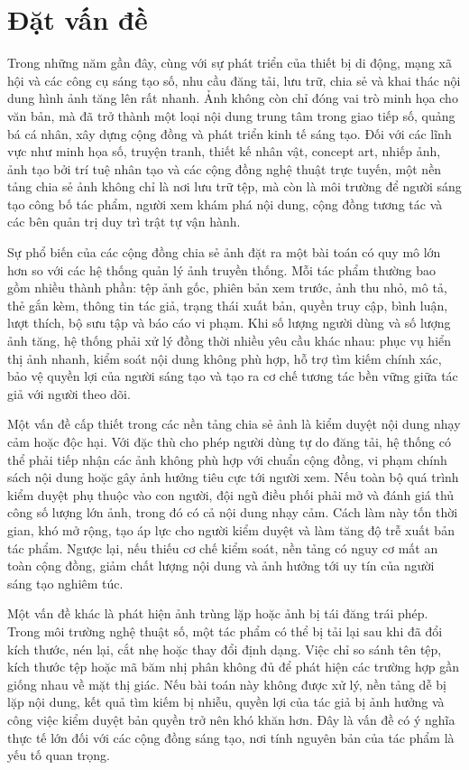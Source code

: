 \section{Đặt vấn đề}

Trong những năm gần đây, cùng với sự phát triển của thiết bị di động, mạng xã hội và các công cụ sáng tạo số, nhu cầu đăng tải, lưu trữ, chia sẻ và khai thác nội dung hình ảnh tăng lên rất nhanh. Ảnh không còn chỉ đóng vai trò minh họa cho văn bản, mà đã trở thành một loại nội dung trung tâm trong giao tiếp số, quảng bá cá nhân, xây dựng cộng đồng và phát triển kinh tế sáng tạo. Đối với các lĩnh vực như minh họa số, truyện tranh, thiết kế nhân vật, concept art, nhiếp ảnh, ảnh tạo bởi trí tuệ nhân tạo và các cộng đồng nghệ thuật trực tuyến, một nền tảng chia sẻ ảnh không chỉ là nơi lưu trữ tệp, mà còn là môi trường để người sáng tạo công bố tác phẩm, người xem khám phá nội dung, cộng đồng tương tác và các bên quản trị duy trì trật tự vận hành.

Sự phổ biến của các cộng đồng chia sẻ ảnh đặt ra một bài toán có quy mô lớn hơn so với các hệ thống quản lý ảnh truyền thống. Mỗi tác phẩm thường bao gồm nhiều thành phần: tệp ảnh gốc, phiên bản xem trước, ảnh thu nhỏ, mô tả, thẻ gắn kèm, thông tin tác giả, trạng thái xuất bản, quyền truy cập, bình luận, lượt thích, bộ sưu tập và báo cáo vi phạm. Khi số lượng người dùng và số lượng ảnh tăng, hệ thống phải xử lý đồng thời nhiều yêu cầu khác nhau: phục vụ hiển thị ảnh nhanh, kiểm soát nội dung không phù hợp, hỗ trợ tìm kiếm chính xác, bảo vệ quyền lợi của người sáng tạo và tạo ra cơ chế tương tác bền vững giữa tác giả với người theo dõi.

Một vấn đề cấp thiết trong các nền tảng chia sẻ ảnh là kiểm duyệt nội dung nhạy cảm hoặc độc hại. Với đặc thù cho phép người dùng tự do đăng tải, hệ thống có thể phải tiếp nhận các ảnh không phù hợp với chuẩn cộng đồng, vi phạm chính sách nội dung hoặc gây ảnh hưởng tiêu cực tới người xem. Nếu toàn bộ quá trình kiểm duyệt phụ thuộc vào con người, đội ngũ điều phối phải mở và đánh giá thủ công số lượng lớn ảnh, trong đó có cả nội dung nhạy cảm. Cách làm này tốn thời gian, khó mở rộng, tạo áp lực cho người kiểm duyệt và làm tăng độ trễ xuất bản tác phẩm. Ngược lại, nếu thiếu cơ chế kiểm soát, nền tảng có nguy cơ mất an toàn cộng đồng, giảm chất lượng nội dung và ảnh hưởng tới uy tín của người sáng tạo nghiêm túc.

Một vấn đề khác là phát hiện ảnh trùng lặp hoặc ảnh bị tái đăng trái phép. Trong môi trường nghệ thuật số, một tác phẩm có thể bị tải lại sau khi đã đổi kích thước, nén lại, cắt nhẹ hoặc thay đổi định dạng. Việc chỉ so sánh tên tệp, kích thước tệp hoặc mã băm nhị phân không đủ để phát hiện các trường hợp gần giống nhau về mặt thị giác. Nếu bài toán này không được xử lý, nền tảng dễ bị lặp nội dung, kết quả tìm kiếm bị nhiễu, quyền lợi của tác giả bị ảnh hưởng và công việc kiểm duyệt bản quyền trở nên khó khăn hơn. Đây là vấn đề có ý nghĩa thực tế lớn đối với các cộng đồng sáng tạo, nơi tính nguyên bản của tác phẩm là yếu tố quan trọng.

